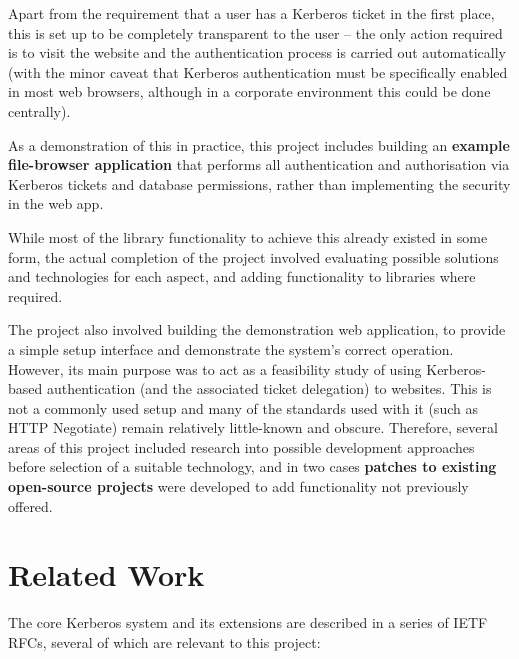 \documentclass[12pt]{report}
\begin{document}
Apart from the requirement that a user has a Kerberos ticket in the first place, this is set up to be completely transparent to the user -- the only action required is to visit the website and the authentication process is carried out automatically (with the minor caveat that Kerberos authentication must be specifically enabled in most web browsers\cite{Kerberos-enable}, although in a corporate environment this could be done centrally).

As a demonstration of this in practice, this project includes building an \textbf{example file-browser application} that performs all authentication and authorisation via Kerberos tickets and database permissions, rather than implementing the security in the web app.

While most of the library functionality to achieve this already existed in some form, the actual completion of the project involved evaluating possible solutions and technologies for each aspect, and adding functionality to libraries where required.

The project also involved building the demonstration web application, to provide a simple setup interface and demonstrate the system's correct operation. However, its main purpose was to act as a feasibility study of using Kerberos-based authentication (and the associated ticket delegation) to websites. This is not a commonly used setup and many of the standards used with it (such as HTTP Negotiate) remain relatively little-known and obscure. Therefore, several areas of this project included research into possible development approaches before selection of a suitable technology, and in two cases \textbf{patches to existing open-source projects} were developed to add functionality not previously offered.

\section{Related Work}
The core Kerberos system and its extensions are described in a series of IETF RFCs, several of which are relevant to this project:
\end{document}
